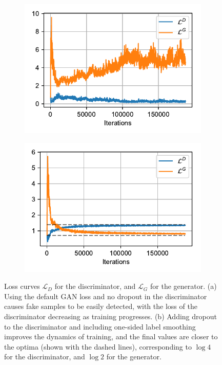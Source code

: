 \documentclass{article}
\begin{document}
\begin{figure}[t]
\begin{subfigure}{0.49\textwidth}
\centering
\includegraphics[scale=0.72]{img/gan_default_curves.pdf}
\caption{}
\end{subfigure}
\begin{subfigure}{0.49\textwidth}
\centering
\includegraphics[scale=0.72]{img/gan_improved_curves.pdf}
\caption{}
\end{subfigure}
 \caption{Loss curves $\mathcal{L}_D$ for the discriminator, and $\mathcal{L}_G$ for the generator. (a) Using the default GAN loss and no dropout in the discriminator causes fake samples to be easily detected, with the loss of the discriminator decreasing as training progresses. (b) Adding dropout to the discriminator and including one-sided label smoothing improves the dynamics of training, and the final values are closer to the optima (shown with the dashed lines), corresponding to $\log 4$ for the discriminator, and $\log 2$ for the generator.}
\label{fig:gan_curves}
\end{figure}
\end{document}
